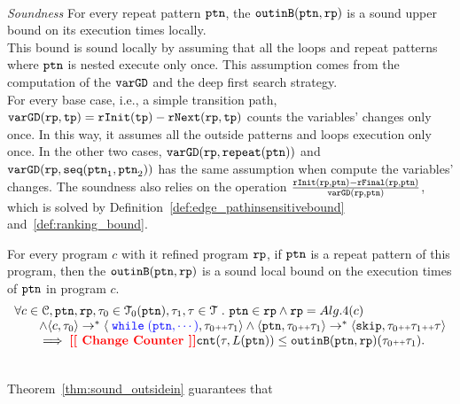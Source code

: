 \\
\emph{Soundness} For every repeat pattern $\mathtt{ptn}$, the $\mathtt{outinB}(\mathtt{ptn}, \mathtt{rp})$
is a sound upper bound on its execution times locally.
\\
This bound is sound locally by assuming
that all the loops and repeat patterns where $\mathtt{ptn}$ is nested execute only once.
This assumption comes from the computation of the $\mathtt{varGD}$ and the deep first search strategy.
\\
For every base case, i.e., a simple transition path, 
$\mathtt{varGD}(\mathtt{rp}, \mathtt{tp}) =  \mathtt{rInit}(\mathtt{tp}) - \mathtt{rNext}(\mathtt{rp}, \mathtt{tp})$
counts the variables' changes only once. In this way, it assumes all the outside patterns and loops execution only once.
In the other two cases,  $\mathtt{varGD}(\mathtt{rp}, \mathtt{repeat}(\mathtt{ptn}))$ and $\mathtt{varGD}(\mathtt{rp}, \mathtt{seq}(\mathtt{ptn}_1, \mathtt{ptn}_2))$
has the same assumption when compute the variables' changes.
The soundness also relies on the operation $\frac{\mathtt{rInit}(\mathtt{rp}, \mathtt{ptn}) - \mathtt{rFinal}(\mathtt{rp}, \mathtt{ptn})}{\mathtt{varGD}(\mathtt{rp}, \mathtt{ptn})}$,
which is solved by Definition~\ref{def:edge_pathinsensitivebound} and~\ref{def:ranking_bound}.
%
\begin{thm}
  \label{thm:sound_outsidein}
  For every program $c$ with it refined program $\mathtt{rp}$,
  if $\mathtt{ptn}$ is a repeat pattern of this program, then the $\mathtt{outinB}(\mathtt{ptn}, \mathtt{rp})$
is a sound local bound on the execution times of $\mathtt{ptn}$ in program $c$.
  \[
    \begin{array}{l}
    \forall c \in \cdom, \rpattern, \rprog, \trace_0 \in \tdom_0(\rpattern), \trace_1, \trace \in \tdom \st 
    \rpattern \in \rprog \land
    \rprog = Alg.4(c)
    \\ \qquad
    \land
    \config{c, \trace_0} \to^* \config{\highlight{\ewhile (\rpattern, \cdots)}, \trace_0 \tracecat \trace_1} 
    \land 
    \config{\rpattern, \trace_0 \tracecat \trace_1} \to^* \config{{\eskip, \trace_0 \tracecat \trace_1 \tracecat \trace}}
    \\ \qquad
    \implies
    \todo{Change Counter}
    {\vcounter(\trace, L(\rpattern))} \leq \outinB(\rpattern, \rprog)(\trace_0 \tracecat \trace_1).
    \end{array}
    \]
\end{thm}
\\
Theorem~\ref{thm:sound_outsidein} guarantees that
